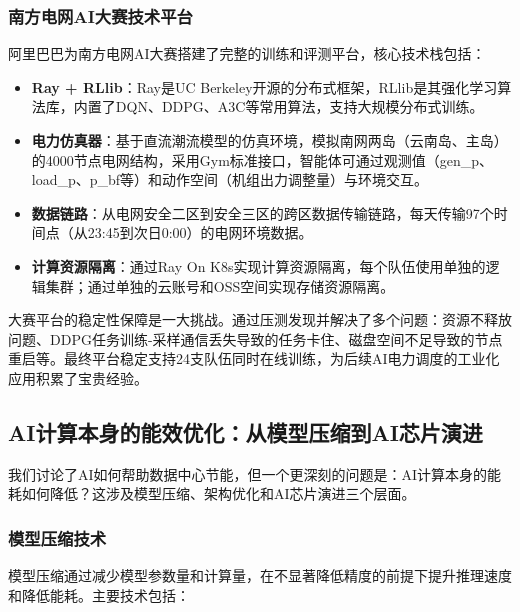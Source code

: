 \subsubsection{南方电网AI大赛技术平台}

阿里巴巴为南方电网AI大赛搭建了完整的训练和评测平台，核心技术栈包括：

\begin{itemize}
    \item \textbf{Ray + RLlib}：Ray是UC Berkeley开源的分布式框架，RLlib是其强化学习算法库，内置了DQN、DDPG、A3C等常用算法，支持大规模分布式训练。

    \item \textbf{电力仿真器}：基于直流潮流模型的仿真环境，模拟南网两岛（云南岛、主岛）的4000节点电网结构，采用Gym标准接口，智能体可通过观测值（gen\_p、load\_p、p\_bf等）和动作空间（机组出力调整量）与环境交互。

    \item \textbf{数据链路}：从电网安全二区到安全三区的跨区数据传输链路，每天传输97个时间点（从23:45到次日0:00）的电网环境数据。

    \item \textbf{计算资源隔离}：通过Ray On K8s实现计算资源隔离，每个队伍使用单独的逻辑集群；通过单独的云账号和OSS空间实现存储资源隔离。
\end{itemize}

大赛平台的稳定性保障是一大挑战。通过压测发现并解决了多个问题：资源不释放问题、DDPG任务训练-采样通信丢失导致的任务卡住、磁盘空间不足导致的节点重启等。最终平台稳定支持24支队伍同时在线训练，为后续AI电力调度的工业化应用积累了宝贵经验。

\subsection{AI计算本身的能效优化：从模型压缩到AI芯片演进}

我们讨论了AI如何帮助数据中心节能，但一个更深刻的问题是：AI计算本身的能耗如何降低？这涉及模型压缩、架构优化和AI芯片演进三个层面。

\subsubsection{模型压缩技术}

模型压缩通过减少模型参数量和计算量，在不显著降低精度的前提下提升推理速度和降低能耗。主要技术包括：

